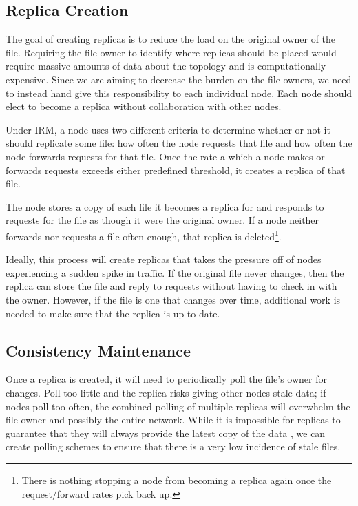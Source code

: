 \documentclass[10pt, conference, compsocconf, letterpaper]{IEEEtran} %
\begin{document}
\subsection{Replica Creation}
The goal of creating replicas is to reduce the load on the original owner of the file.  Requiring the file owner to identify where replicas should be placed would require massive amounts of data about the topology and is computationally expensive.  Since we are aiming to decrease the burden on the file owners, we need to instead hand give this responsibility to each individual node.  Each node should elect to become a replica without collaboration with other nodes.


Under IRM, a node uses two different criteria to determine whether or not it should replicate some file: how often the node requests that file and how often the node forwards requests for that file. Once the rate a which a node makes or forwards requests exceeds either predefined threshold, it creates a replica of that file. 

The node stores a copy of each file it becomes a replica for and responds to requests for the file as though it were the original owner.  If a node neither forwards nor requests a file often enough, that replica is deleted\footnote{There is nothing stopping a node from becoming a replica again once the request/forward rates pick back up.}.


Ideally, this process will create replicas that takes the pressure off of nodes experiencing a sudden spike in traffic.  If the original file never changes, then the replica can store the file and reply to requests without having to check in with the owner.  However, if the file is one that changes over time, additional work is needed to make sure that the replica is up-to-date.


\subsection{Consistency Maintenance}
Once a replica  is created, it will need to periodically poll the file's owner for changes.  Poll too little and the replica risks giving other nodes stale data; if nodes poll too often, the combined polling of multiple replicas will overwhelm the file owner and possibly the entire network.  While it is impossible for replicas to guarantee that they will always provide the latest copy of the data \cite{Gilbert:2002:BCF:564585.564601}, we can create polling schemes to ensure that there is a very low incidence of stale files. 
\end{document}
